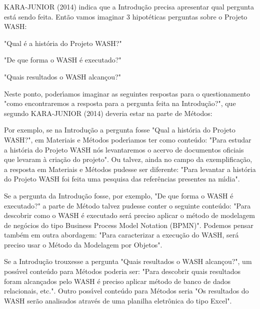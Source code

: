 \documentclass[
12pt,		%
openright,	%
twoside,  %
a4paper,			%
chapter=TITLE,		%
english,			%
french,				%
spanish,			%
brazil				%
]{USPSC-classe/USPSC}
\begin{document}
 KARA-JUNIOR (2014) indica que a Introdu\c{c}\~ao precisa apresentar qual pergunta est\'a sendo feita. Ent\~ao vamos imaginar 3 hipot\'eticas perguntas sobre o Projeto WASH:



\begin{alineas}
\item "Qual \'e a hist\'oria do Projeto WASH?"
\item "De que forma o WASH \'e executado?"
\item "Quais resultados o WASH alcan\c{c}ou?"
\end{alineas}

Neste ponto, poder\'{\i}amos imaginar as seguintes respostas para o questionamento "como encontraremos a resposta para a pergunta feita na Introdu\c{c}\~ao?", que segundo KARA-JUNIOR (2014) deveria estar na parte de M\'etodos:



\begin{alineas}
\item Por exemplo, se na Introdu\c{c}\~ao a pergunta fosse "Qual a hist\'oria do Projeto WASH?", em Materiais e M\'etodos poder\'{\i}amos ter como  conte\'udo: "Para estudar a hist\'oria do Projeto WASH n\'os levantaremos o acervo de documentos oficiais que levaram \`a cria\c{c}\~ao do projeto". Ou talvez, ainda no campo da exemplifica\c{c}\~ao, a resposta em Materiais e M\'etodos pudesse ser diferente: "Para levantar a hist\'oria do Projeto WASH foi feita uma pesquisa das refer\^encias presentes na m\'{\i}dia".
\item Se a pergunta da Introdu\c{c}\~ao fosse, por exemplo, "De que forma o WASH \'e executado?" a parte de M\'etodo talvez pudesse conter o seguinte conte\'udo: "Para descobrir como o WASH \'e executado ser\'a preciso aplicar o m\'etodo de modelagem de neg\'ocios do tipo Business Process Model Notation (BPMN)". Podemos pensar tamb\'em em outra abordagem: "Para caracterizar a execu\c{c}\~ao do WASH, ser\'a preciso usar o M\'etodo da Modelagem por Objetos".
\item Se a Introdu\c{c}\~ao trouxesse a pergunta "Quais resultados o WASH alcan\c{c}ou?", um poss\'{\i}vel conte\'udo para M\'etodos poderia ser: "Para descobrir quais resultados foram alcan\c{c}ados pelo WASH \'e preciso aplicar m\'etodo de banco de dados relacionais, etc.". Outro poss\'{\i}vel conte\'udo para M\'etodos seria "Os resultados do WASH ser\~ao analisados atrav\'es de uma planilha eletr\^onica do tipo Excel".
\end{alineas}
\end{document}

